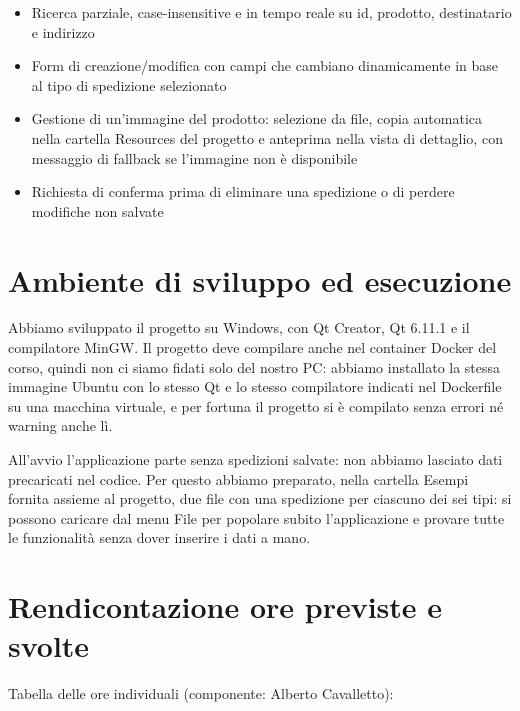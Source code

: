 \documentclass[10pt,a4paper]{article}
\begin{document}
\begin{itemize}
  \item Ricerca parziale, case-insensitive e in tempo reale su id, prodotto, destinatario e indirizzo
  \item Form di creazione/modifica con campi che cambiano dinamicamente in base al tipo di spedizione selezionato
  \item Gestione di un'immagine del prodotto: selezione da file, copia automatica nella cartella Resources del progetto e anteprima nella vista di dettaglio, con messaggio di fallback se l'immagine non è disponibile
  \item Richiesta di conferma prima di eliminare una spedizione o di perdere modifiche non salvate
\end{itemize}

\section{Ambiente di sviluppo ed esecuzione}

Abbiamo sviluppato il progetto su Windows, con Qt Creator, Qt 6.11.1 e il compilatore MinGW. Il progetto deve compilare anche nel container Docker del corso, quindi non ci siamo fidati solo del nostro PC: abbiamo installato la stessa immagine Ubuntu con lo stesso Qt e lo stesso compilatore indicati nel Dockerfile su una macchina virtuale, e per fortuna il progetto si è compilato senza errori né warning anche lì.

All'avvio l'applicazione parte senza spedizioni salvate: non abbiamo lasciato dati precaricati nel codice. Per questo abbiamo preparato, nella cartella Esempi fornita assieme al progetto, due file con una spedizione per ciascuno dei sei tipi: si possono caricare dal menu File per popolare subito l'applicazione e provare tutte le funzionalità senza dover inserire i dati a mano.

\section{Rendicontazione ore previste e svolte}

Tabella delle ore individuali (componente: Alberto Cavalletto):
\end{document}
